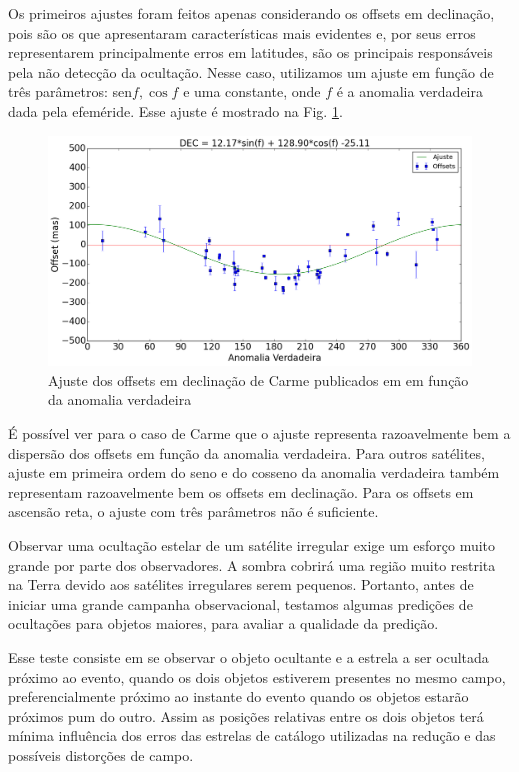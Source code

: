 \documentclass[12pt,a4paper]{monografia}
\begin{document}
Os primeiros ajustes foram feitos apenas considerando os offsets em declinação, pois são os que apresentaram características mais evidentes e, por seus erros representarem principalmente erros em latitudes, são os principais responsáveis pela não detecção da ocultação. Nesse caso, utilizamos um ajuste em função de três parâmetros: sen${f}, \cos{f}$ e uma constante, onde $f$ é a anomalia verdadeira dada pela efeméride. Esse ajuste é mostrado na Fig. \ref{Fig: Carme-dec-fit}.

\begin{figure}
\begin{centering}
\includegraphics[scale=0.45]{figuras/Carme-DEC_fit.png} 
\caption{Ajuste dos offsets em declinação de Carme publicados em \cite{GomesJunior2015-Irregular} em função da anomalia verdadeira}
\label{Fig: Carme-dec-fit}
\end{centering}
\end{figure}

É possível ver para o caso de Carme que o ajuste representa razoavelmente bem a dispersão dos offsets em função da anomalia verdadeira. Para outros satélites, ajuste em primeira ordem do seno e do cosseno da anomalia verdadeira também representam razoavelmente bem os offsets em declinação. Para os offsets em ascensão reta, o ajuste com três parâmetros não é suficiente.

Observar uma ocultação estelar de um satélite irregular exige um esforço muito grande por parte dos observadores. A sombra cobrirá uma região muito restrita na Terra devido aos satélites irregulares serem pequenos. Portanto, antes de iniciar uma grande campanha observacional, testamos algumas predições de ocultações para objetos maiores, para avaliar a qualidade da predição.

Esse teste consiste em se observar o objeto ocultante e a estrela a ser ocultada próximo ao evento, quando os dois objetos estiverem presentes no mesmo campo, preferencialmente próximo ao instante do evento quando os objetos estarão próximos pum do outro. Assim as posições relativas entre os dois objetos terá mínima influência dos erros das estrelas de catálogo utilizadas na redução e das possíveis distorções de campo.
\end{document}
